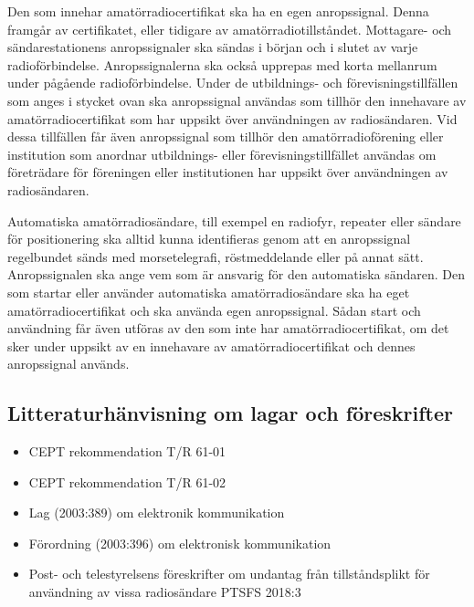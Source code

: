 \newpage %
Den som innehar amatörradiocertifikat ska ha en egen anropssignal.
Denna framgår av certifikatet, eller tidigare av amatörradiotillståndet.
Mottagare- och sändarestationens anropssignaler ska sändas i början och i
slutet av varje radioförbindelse.
Anropssignalerna ska också upprepas med korta mellanrum under pågående
radioförbindelse. Under de utbildnings- och förevisningstillfällen som anges i
stycket ovan ska anropssignal användas som tillhör den innehavare av
amatörradiocertifikat som har uppsikt över användningen av radiosändaren.
Vid dessa tillfällen får även anropssignal som tillhör den amatörradioförening
eller institution som anordnar utbildnings- eller förevisningstillfället
användas om företrädare för föreningen eller institutionen har uppsikt över
användningen av radiosändaren.

Automatiska amatörradiosändare, till exempel en radiofyr, repeater eller
sändare för positionering ska alltid kunna identifieras genom att en
anropssignal regelbundet sänds med morsetelegrafi, röstmeddelande eller
på annat sätt.
Anropssignalen ska ange vem som är ansvarig för den automatiska sändaren.
Den som startar eller använder automatiska amatörradiosändare ska ha eget
amatörradiocertifikat och ska använda egen anropssignal.
Sådan start och användning får även utföras av den som inte har
amatörradiocertifikat, om det sker under uppsikt av en innehavare av
amatörradiocertifikat och dennes anropssignal används.

\subsection{Litteraturhänvisning om lagar och föreskrifter}

\begin{itemize}
\item CEPT rekommendation T/R 61-01 \cite{TR6101}
\item CEPT rekommendation T/R 61-02 \cite{TR6102}
\item Lag (2003:389) om elektronik kommunikation \cite{SFS2003:389}
\item Förordning (2003:396) om elektronisk kommunikation \cite{SFS2003:396}
\item Post- och telestyrelsens föreskrifter om undantag från tillståndsplikt för
användning av vissa radiosändare PTSFS 2018:3 \cite{PTSFS2018:3}
\end{itemize}
